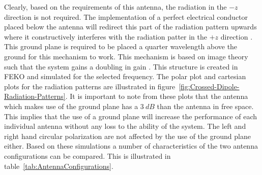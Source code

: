 \documentclass[11pt]{witseiepaper}
\begin{document}
Clearly, based on the requirements of this antenna, the radiation in the $-z$ direction is not required. The implementation of a perfect electrical conductor placed below the antenna will redirect this part of the radiation pattern upwards where it constructively interferes with the radiation patter in the $+z$ direction \cite[p.~110-111]{IEEECrossedDipole}. This ground plane is required to be placed a quarter wavelength above the ground for this mechanism to work. This mechanism is based on image theory such that the system gains a doubling in gain \cite[p.~111]{IEEECrossedDipole}. This structure is created in FEKO and simulated for the selected frequency. The polar plot and cartesian plots for the radiation patterns are illustrated in figure~\ref{fig:Crossed-Dipole-Radiation-Patterns}. It is important to note from these plots that the antenna which makes use of the ground plane has a $3~dB$ than the antenna in free space. This implies that the use of a ground plane will increase the performance of each individual antenna without any loss to the ability of the system. The left and right hand circular polarization are not affected by the use of the ground plane either. Based on these simulations a number of characteristics of the two antenna configurations can be compared. This is illustrated in table~\ref{tab:AntennaConfigurations}.
\end{document}
